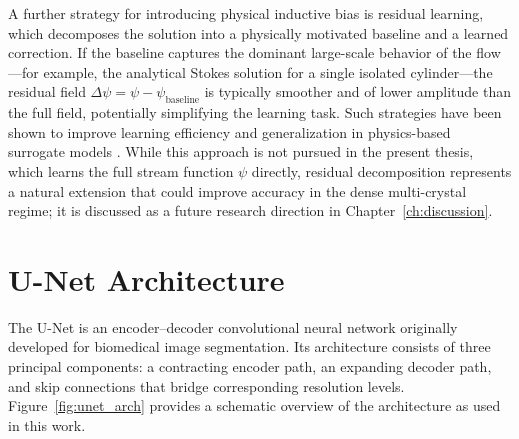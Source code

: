 A further strategy for introducing physical inductive bias is residual learning, which decomposes the solution into a physically motivated baseline and a learned correction. If the baseline captures the dominant large-scale behavior of the flow—for example, the analytical Stokes solution for a single isolated cylinder—the residual field $\Delta\psi = \psi - \psi_{\text{baseline}}$ is typically smoother and of lower amplitude than the full field, potentially simplifying the learning task. Such strategies have been shown to improve learning efficiency and generalization in physics-based surrogate models \parencite{sun_surrogate_2020}. While this approach is not pursued in the present thesis, which learns the full stream function $\psi$ directly, residual decomposition represents a natural extension that could improve accuracy in the dense multi-crystal regime; it is discussed as a future research direction in Chapter~\ref{ch:discussion}.

\section{U-Net Architecture}
\label{sec:unet}

The U-Net \parencite{ronneberger_u-net_2015} is an encoder--decoder convolutional neural
network originally developed for biomedical image segmentation. Its
architecture consists of three principal components: a contracting encoder
path, an expanding decoder path, and skip connections that bridge
corresponding resolution levels. Figure~\ref{fig:unet_arch} provides a
schematic overview of the architecture as used in this work.

